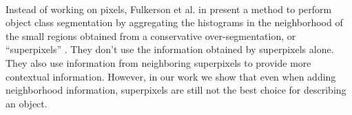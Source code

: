 \documentclass[10pt,twocolumn,letterpaper]{article}
\begin{document}
\begin{figure}
\centering
{}\\
\label{fig:obj_seg}
\end{figure}

Instead of working on pixels, Fulkerson et al. in \cite{fulkerson09class}
present a method to perform object class segmentation by aggregating the
histograms in the neighborhood of the small regions obtained from a conservative
over-segmentation, or ``superpixels'' \cite{Ren03learninga,4587471}.
They don't use the information obtained by superpixels alone. They also
use information from neighboring superpixels to provide more contextual
information. However, in our work we show that even when adding neighborhood
information, superpixels are still not the best choice for describing an object.
\end{document}
